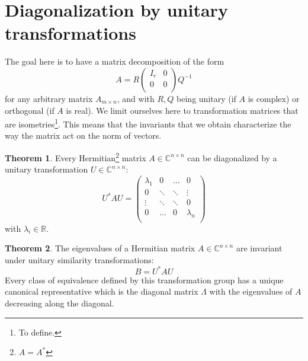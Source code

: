 \documentclass[12pt, openany]{report}
\theoremstyle{definition}
\newtheorem{thm}{Theorem}[chapter]
\newcommand{\R}{\mathbb{R}}
\newcommand{\C}{\mathbb{C}}
\begin{document}
\section{Diagonalization by unitary transformations}
The goal here is to have a matrix decomposition of the form 
\begin{equation}
    A = R\begin{pmatrix}
        I_r & 0\\ 0& 0 \\
    \end{pmatrix}Q^{-1}
\end{equation}
for any arbitrary matrix \(A_{m\times n}\), and with \(R,Q\) being unitary (if \(A\) is complex) or orthogonal (if \(A\) is real). We limit ourselves here to transformation matrices that are isometries\footnote{To define.}. This means that the invariants that we obtain characterize the way the matrix act on the norm of vectors. 
\begin{thm}
    Every Hermitian\footnote{\(A=A^*\)} matrix \(A\in \C^{n\times n}\) can be diagonalized by a unitary transformation \(U\in \C^{n\times n}\):
    \begin{equation}
        U^*AU = \begin{pmatrix}
            \lambda_1 & 0 & \dots & 0\\
            0&\ddots &\ddots & \vdots \\
            \vdots & \ddots & \ddots & 0\\
            0 & \dots & 0 & \lambda_n\\
        \end{pmatrix}
    \end{equation}
    with \(\lambda_i\in \R\).
\end{thm}
\begin{thm} 
    The eigenvalues of a Hermitian matrix \(A\in \C^{n\times n}\) are invariant under unitary similarity transformations:
    \begin{equation}
        B=U^*AU
    \end{equation}
    Every class of equivalence defined by this transformation group has a unique canonical representative which is the diagonal matrix \(\Lambda\) with the eigenvalues of \(A\) decreasing along the diagonal.
\end{thm}
\end{document}
